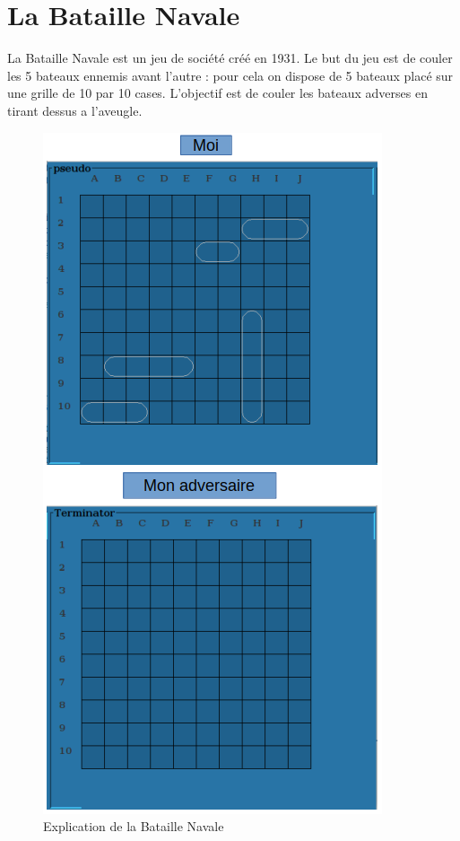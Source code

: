 \section{La Bataille Navale}    
La Bataille Navale est un jeu de société créé en 1931.
Le but du jeu est de couler les 5 bateaux ennemis avant l'autre : pour cela on dispose de 5 bateaux placé sur une grille de 10 par 10 cases. L'objectif est de couler les bateaux adverses en tirant dessus a l'aveugle.
    \begin{figure}[htp]
        \center
        \includegraphics[scale=0.5]{images/BatailleNavale/HvsR.png}
        \caption{\label{ fig : BattleShip }Explication de la Bataille Navale}
    \end{figure}